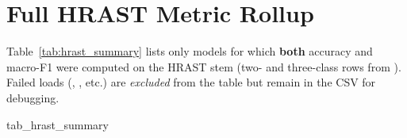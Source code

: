 \appendices

\section{Full HRAST Metric Rollup}
\label{app:hrast}

Table~\ref{tab:hrast_summary} lists only models for which \textbf{both} accuracy and macro-F1 were computed on the HRAST stem (two- and three-class rows from ). Failed loads (, , etc.) are \emph{excluded} from the table but remain in the CSV for debugging.

{tab_hrast_summary}
